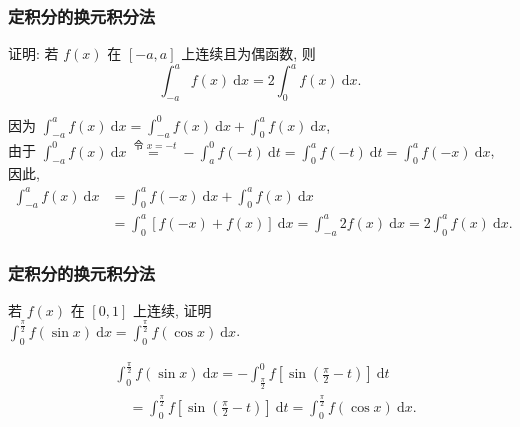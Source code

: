 \documentclass[
10pt,
aspectratio=43,
]{beamer}
\begin{document}
\begin{frame}
	\frametitle{定积分的换元积分法}
	\everymath{\displaystyle}
	\begin{block}{}
		证明: 若 $f(x)$ 在 $[-a, a]$ 上连续且为偶函数, 则
		$$
			\int_{-a}^a f(x) \mathrm{~d} x=2 \int_0^a f(x) \mathrm{~d} x .
		$$
	\end{block}
	\pause
	\begin{exampleblock}{}
		因为 $\int_{-a}^a f(x) \mathrm{~d} x=\int_{-a}^0 f(x) \mathrm{~d} x+\int_0^a f(x) \mathrm{~d} x$,\\\vspace{0.2cm}
		由于 $\int_{-a}^0 f(x) \mathrm{~d} x \stackrel{\text { 令 } x=-t}{=}-\int_a^0 f(-t) \mathrm{~d} t=\int_0^a f(-t) \mathrm{~d} t=\int_0^a f(-x) \mathrm{~d} x$,\\\vspace{0.2cm}
		\pause
		因此,
		$$
			\begin{aligned}
				\int_{-a}^a f(x) \mathrm{~d} x & =\int_0^a f(-x) \mathrm{~d} x+\int_0^a f(x) \mathrm{~d} x                                            \\
				                               & =\int_0^a[f(-x)+f(x)] \mathrm{~d} x=\int_{-a}^a 2 f(x) \mathrm{~d} x=2 \int_0^a f(x) \mathrm{~d} x .
			\end{aligned}
		$$
	\end{exampleblock}
\end{frame}

\begin{frame}
	\frametitle{定积分的换元积分法}
	\everymath{\displaystyle}
	\begin{block}{}
		若 $f(x)$ 在 $[0,1]$ 上连续, 证明\\\vspace{0.1cm}
		$\int_0^{\frac{\pi}{2}} f(\sin x) \mathrm{~d} x=\int_0^{\frac{\pi}{2}} f(\cos x) \mathrm{~d} x$.
	\end{block}
	\pause
	\vspace{0.6cm}
	\begin{exampleblock}{}
		$$
			\begin{aligned}
				 & \int_0^{\frac{\pi}{2}} f(\sin x) \mathrm{~d} x=-\int_{\frac{\pi}{2}}^0 f\left[\sin \left(\frac{\pi}{2}-t\right)\right] \mathrm{~d} t        \\
				 & \quad=\int_0^{\frac{\pi}{2}} f\left[\sin \left(\frac{\pi}{2}-t\right)\right] \mathrm{~d} t=\int_0^{\frac{\pi}{2}} f(\cos x) \mathrm{~d} x .
			\end{aligned}
		$$
	\end{exampleblock}
\end{frame}
\end{document}
